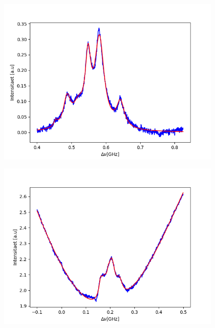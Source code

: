 \documentclass[a4paper,parskip]{scrartcl}
\begin{document}
\begin{figure}[h]
\includegraphics[scale = 0.5]{./saturation/peak2/gaussCorrected.png}
\end{figure}

\begin{figure}[h]
\includegraphics[scale = 0.5]{./saturation/peak3/fit.png}
\end{figure}
\end{document}

